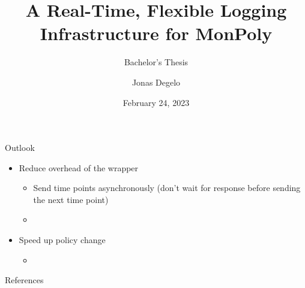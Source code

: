 \documentclass{beamer}
\title{A Real-Time, Flexible Logging Infrastructure for MonPoly}
\subtitle{Bachelor's Thesis}
\author{Jonas Degelo}
\institute{ETH Zürich}
\date{February 24, 2023}
\begin{document}
\begin{frame}
    \titlepage
\end{frame}







\begin{frame}{Outlook}
    \begin{itemize}
        \item Reduce overhead of the wrapper
        \begin{itemize}
            \item Send time points asynchronously (don't wait for response before sending the next time point)
            \item 
        \end{itemize}
        \item Speed up policy change
        \begin{itemize}
            \item 
        \end{itemize}
    \end{itemize}
    
\end{frame}

\begin{frame}{References}
    \printbibliography %
\end{frame}
\end{document}
